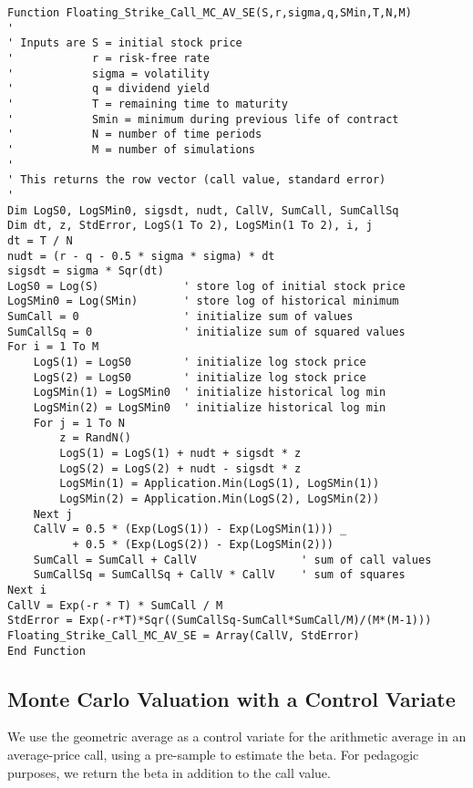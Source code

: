 \small\begin{verbatim}
Function Floating_Strike_Call_MC_AV_SE(S,r,sigma,q,SMin,T,N,M)
'
' Inputs are S = initial stock price
'            r = risk-free rate
'            sigma = volatility
'            q = dividend yield
'            T = remaining time to maturity
'            Smin = minimum during previous life of contract
'            N = number of time periods
'            M = number of simulations
'
' This returns the row vector (call value, standard error)
'
Dim LogS0, LogSMin0, sigsdt, nudt, CallV, SumCall, SumCallSq
Dim dt, z, StdError, LogS(1 To 2), LogSMin(1 To 2), i, j
dt = T / N
nudt = (r - q - 0.5 * sigma * sigma) * dt
sigsdt = sigma * Sqr(dt)
LogS0 = Log(S)             ' store log of initial stock price
LogSMin0 = Log(SMin)       ' store log of historical minimum
SumCall = 0                ' initialize sum of values
SumCallSq = 0              ' initialize sum of squared values
For i = 1 To M
    LogS(1) = LogS0        ' initialize log stock price
    LogS(2) = LogS0        ' initialize log stock price
    LogSMin(1) = LogSMin0  ' initialize historical log min 
    LogSMin(2) = LogSMin0  ' initialize historical log min 
    For j = 1 To N
        z = RandN()
        LogS(1) = LogS(1) + nudt + sigsdt * z        
        LogS(2) = LogS(2) + nudt - sigsdt * z        
        LogSMin(1) = Application.Min(LogS(1), LogSMin(1)) 
        LogSMin(2) = Application.Min(LogS(2), LogSMin(2)) 
    Next j
    CallV = 0.5 * (Exp(LogS(1)) - Exp(LogSMin(1))) _
          + 0.5 * (Exp(LogS(2)) - Exp(LogSMin(2)))
    SumCall = SumCall + CallV                ' sum of call values
    SumCallSq = SumCallSq + CallV * CallV    ' sum of squares
Next i
CallV = Exp(-r * T) * SumCall / M
StdError = Exp(-r*T)*Sqr((SumCallSq-SumCall*SumCall/M)/(M*(M-1)))
Floating_Strike_Call_MC_AV_SE = Array(CallV, StdError)
End Function
\end{verbatim}\normalsize

\subsection*{Monte Carlo Valuation with a Control Variate}

We use the geometric average as a control variate for the arithmetic average in an average-price call, using a pre-sample to estimate the beta.  For pedagogic purposes, we return the beta in addition to the call value.    

